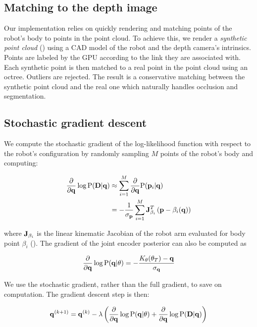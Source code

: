 \subsection{Matching to the depth image}
Our implementation relies on quickly rendering and matching points of the robot's body to points in the point cloud. To achieve this, we render a \textit{synthetic point cloud} () using a CAD model of the robot and the depth camera's intrinsics. Points are labeled by the GPU according to the link they are associated with. Each synthetic point is then matched to a real point in the point cloud using an octree. Outliers are rejected. The result is a conservative matching between the synthetic point cloud and the real one which naturally handles occlusion and segmentation.

\subsection{Stochastic gradient descent}
We compute the stochastic gradient of the log-likelihood function with respect to the robot's configuration by randomly sampling $M$ points of the robot's body and computing:

\begin{align}
	\frac{\partial}{\partial \mathbf{q}} \log \text{P}(\mathbf{D} | \mathbf{q}) &\approx \sum_{i = 1}^{M}  \frac{\partial}{\partial \mathbf{q}}  \text{P}(\mathbf{p}_i | \mathbf{q}) \\
		&= -\frac{1}{\sigma_{\mathbf{p}}}\sum_{i = 1}^{M} \mathbf{J}_{\beta_i}^{T}\left(\mathbf{p} - \beta_i(\mathbf{q})\right)
\end{align}

\noindent where $\mathbf{J}_{\beta_i}$ is the linear kinematic Jacobian of the robot arm evaluated for body point $\beta_i$ (). The gradient of the joint encoder posterior can also be computed as

\begin{align}
	\frac{\partial}{\partial \mathbf{q}} \log \text{P}(\mathbf{q} | \theta) = -\frac{K_\theta(\theta_T) - \mathbf{q}}{\sigma_{\mathbf{q}}}
\end{align}

We use the stochastic gradient, rather than the full gradient, to save on computation. The gradient descent step is then:

\begin{equation}
	\mathbf{q}^{(k +1)} = \mathbf{q}^{(k)} - \lambda\left(\frac{\partial}{\partial \mathbf{q}} \log \text{P}(\mathbf{q} | \theta) + \frac{\partial}{\partial \mathbf{q}} \log \text{P}(\mathbf{D} | \mathbf{q})\right)
\end{equation}


